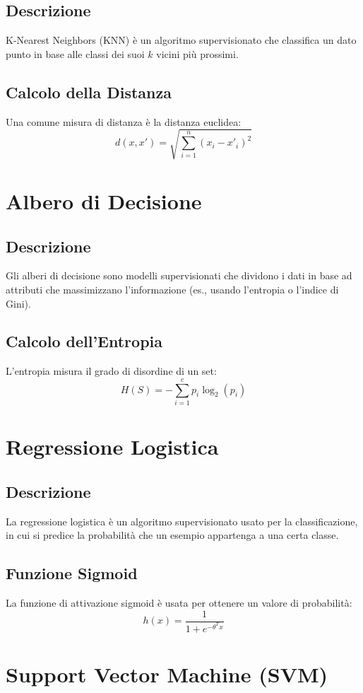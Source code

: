 \documentclass[a4paper,12pt]{report}
\begin{document}
\section{Descrizione}
K-Nearest Neighbors (KNN) è un algoritmo supervisionato che classifica un dato punto in base alle classi dei suoi \( k \) vicini più prossimi.

\section{Calcolo della Distanza}
Una comune misura di distanza è la distanza euclidea:
\[
d(x, x') = \sqrt{\sum_{i=1}^n (x_i - x'_i)^2}
\]

\chapter{Albero di Decisione}
\section{Descrizione}
Gli alberi di decisione sono modelli supervisionati che dividono i dati in base ad attributi che massimizzano l'informazione (es., usando l’entropia o l’indice di Gini).

\section{Calcolo dell'Entropia}
L'entropia misura il grado di disordine di un set:
\[
H(S) = - \sum_{i=1}^{c} p_i \log_2(p_i)
\]

\chapter{Regressione Logistica}
\section{Descrizione}
La regressione logistica è un algoritmo supervisionato usato per la classificazione, in cui si predice la probabilità che un esempio appartenga a una certa classe.

\section{Funzione Sigmoid}
La funzione di attivazione sigmoid è usata per ottenere un valore di probabilità:
\[
h(x) = \frac{1}{1 + e^{-\theta^T x}}
\]

\chapter{Support Vector Machine (SVM)}
\end{document}
